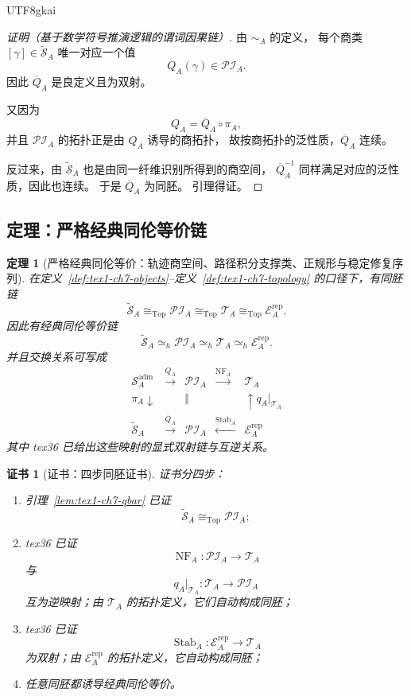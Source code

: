 \documentclass[12pt]{article}
\newtheorem{theorem}{定理}[section]
\newtheorem{Certificate}{证书}[section]
\begin{document}
\begin{CJK*}{UTF8}{gkai}
\begin{proof}[证明（基于数学符号推演逻辑的谓词因果链）]
由 \(\sim_A\) 的定义，
每个商类 \([\gamma]\in\widetilde{\mathcal S}_A\) 唯一对应一个值
\[
  Q_A(\gamma)\in \mathcal{PI}_A.
\]
因此 \(\overline Q_A\) 是良定义且为双射。

又因为
\[
  Q_A=\overline Q_A\circ \pi_A,
\]
并且 \(\mathcal{PI}_A\) 的拓扑正是由 \(Q_A\) 诱导的商拓扑，
故按商拓扑的泛性质，\(\overline Q_A\) 连续。

反过来，由 \(\widetilde{\mathcal S}_A\) 也是由同一纤维识别所得到的商空间，
\(\overline Q_A^{-1}\) 同样满足对应的泛性质，因此也连续。
于是 \(\overline Q_A\) 为同胚。
引理得证。
\end{proof}

\subsection{定理：严格经典同伦等价链}
\label{subsec:tex1-ch7-theorem}

\begin{theorem}[严格经典同伦等价：轨迹商空间、路径积分支撑类、正规形与稳定修复序列]
\label{thm:tex1-ch7-classical}
在定义~\ref{def:tex1-ch7-objects}--定义~\ref{def:tex1-ch7-topology} 的口径下，有同胚链
\[
  \widetilde{\mathcal S}_A
  \cong_{\mathrm{Top}}
  \mathcal{PI}_A
  \cong_{\mathrm{Top}}
  \mathcal T_A
  \cong_{\mathrm{Top}}
  \mathcal E_A^{\mathrm{rep}}.
\]
因此有经典同伦等价链
\[
  \widetilde{\mathcal S}_A
  \simeq_h
  \mathcal{PI}_A
  \simeq_h
  \mathcal T_A
  \simeq_h
  \mathcal E_A^{\mathrm{rep}}.
\]
并且交换关系可写成
\[
\begin{array}{ccccc}
  \mathcal S_A^{\mathrm{adm}} & \xrightarrow{Q_A} & \mathcal{PI}_A & \xrightarrow{\operatorname{NF}_A} & \mathcal T_A \\
  \pi_A\downarrow & & \Vert & & \uparrow q_A|_{\mathcal T_A} \\
  \widetilde{\mathcal S}_A & \xrightarrow{\overline Q_A} & \mathcal{PI}_A & \xleftarrow{\operatorname{Stab}_A} &
    \mathcal E_A^{\mathrm{rep}}
\end{array}
\]
其中 tex36 已给出这些映射的显式双射链与互逆关系。
\end{theorem}

\begin{Certificate}[证书：四步同胚证书]
\label{cert:tex1-ch7-classical}
证书分四步：
\begin{enumerate}
  \item 引理~\ref{lem:tex1-ch7-qbar} 已证
  \[
    \widetilde{\mathcal S}_A
    \cong_{\mathrm{Top}}
    \mathcal{PI}_A;
  \]
  \item tex36 已证
  \[
    \operatorname{NF}_A:\mathcal{PI}_A\to \mathcal T_A
  \]
  与
  \[
    q_A|_{\mathcal T_A}:\mathcal T_A\to\mathcal{PI}_A
  \]
  互为逆映射；由 \(\mathcal T_A\) 的拓扑定义，它们自动构成同胚；
  \item tex36 已证
  \[
    \operatorname{Stab}_A:\mathcal E_A^{\mathrm{rep}}\to\mathcal T_A
  \]
  为双射；由 \(\mathcal E_A^{\mathrm{rep}}\) 的拓扑定义，它自动构成同胚；
  \item 任意同胚都诱导经典同伦等价。
\end{enumerate}
\end{Certificate}


\end{CJK*}
\end{document}
